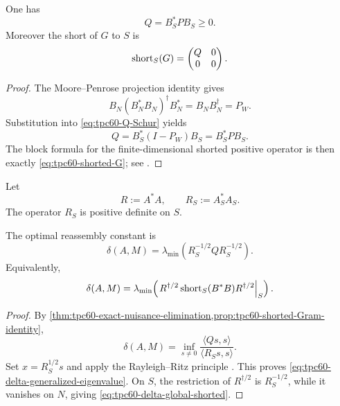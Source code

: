 \begin{proposition}
\label{prop:tpc60-shorted-Gram-identity}
One has
\begin{equation}
 \boxed{
 Q=B_S^*PB_S\ge0.}
 \label{eq:tpc60-Q-projected-Gram}
\end{equation}
Moreover the short of \(G\) to \(S\) is
\begin{equation}
 \operatorname{short}_S(G)
 =
 \begin{pmatrix}Q&0\\0&0\end{pmatrix}.
 \label{eq:tpc60-shorted-G}
\end{equation}
\end{proposition}

\begin{proof}
The Moore--Penrose projection identity gives
\begin{equation}
 B_N(B_N^*B_N)^\dagger B_N^*
 =B_NB_N^\dagger=P_W.
 \label{eq:tpc60-BN-projection-identity}
\end{equation}
Substitution into \eqref{eq:tpc60-Q-Schur} yields
\[
 Q=B_S^*(I-P_W)B_S=B_S^*PB_S.
\]
The block formula for the finite-dimensional shorted positive operator is
then exactly \eqref{eq:tpc60-shorted-G}; see
\citet{AndersonTrapp1975}.
\end{proof}

Let
\begin{equation}
 R:=A^*A,
 \qquad R_S:=A_S^*A_S.
 \label{eq:tpc60-RRS}
\end{equation}
The operator \(R_S\) is positive definite on \(S\).

\begin{theorem}
\label{thm:tpc60-shorted-generalized-eigenvalue}
The optimal reassembly constant is
\begin{equation}
 \boxed{
 \delta(A,M)
 =\lambda_{\min}\!\left(
  R_S^{-1/2}QR_S^{-1/2}
 \right).}
 \label{eq:tpc60-delta-generalized-eigenvalue}
\end{equation}
Equivalently,
\begin{equation}
 \delta(A,M)
 =\lambda_{\min}\!\left(
 \left.
 R^{\dagger/2}\operatorname{short}_S(B^*B)R^{\dagger/2}
 \right|_S
 \right).
 \label{eq:tpc60-delta-global-shorted}
\end{equation}
\end{theorem}

\begin{proof}
By \cref{thm:tpc60-exact-nuisance-elimination,prop:tpc60-shorted-Gram-identity},
\[
 \delta(A,M)
 =\inf_{s\ne0}
   \frac{\langle Qs,s\rangle}{\langle R_Ss,s\rangle}.
\]
Set \(x=R_S^{1/2}s\) and apply the Rayleigh--Ritz principle
\citep{HornJohnson2013}.  This proves
\eqref{eq:tpc60-delta-generalized-eigenvalue}.  On \(S\), the restriction
of \(R^{\dagger/2}\) is \(R_S^{-1/2}\), while it vanishes on \(N\), giving
\eqref{eq:tpc60-delta-global-shorted}.
\end{proof}

